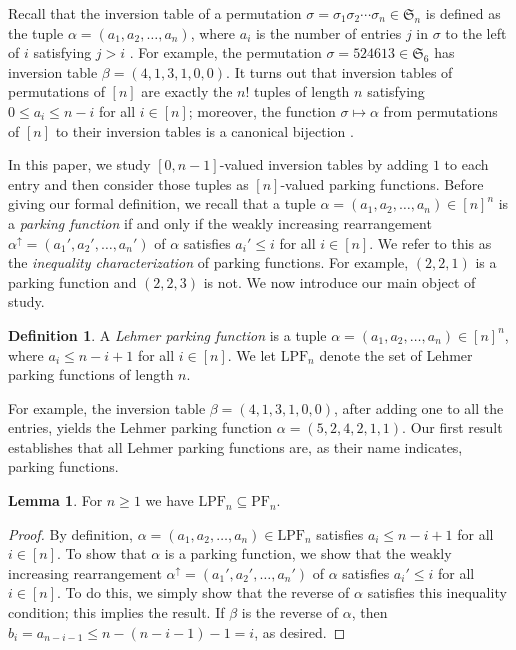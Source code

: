 \documentclass{amsart}
\newcommand{\IT}{\mathrm{LPF}}
\newcommand{\PF}{\mathrm{PF}}
\theoremstyle{definition}
\newtheorem{lemma}[theorem]{Lemma}
\theoremstyle{definition}
\newtheorem{definition}{Definition}[section]
\theoremstyle{remark}
\begin{document}
Recall that the inversion table of a permutation $\sigma=\sigma_1\sigma_2\cdots\sigma_{n}\in\mathfrak{S}_n$ is defined as the tuple $\alpha=(a_1,a_2,\ldots,a_{n})$, where $a_i$ is the number of entries $j$ in $\sigma$ to the left of $i$ satisfying $j>i$ \cite[p. 30]{StanleyECVol1}.
For example, the permutation $\sigma=524613\in\mathfrak{S}_6$ has inversion table $\beta=(4,1,3,1,0,0)$.
It turns out that inversion tables of permutations of $[n]$ are exactly the $n!$ tuples of length $n$ satisfying $0\le a_i\le n-i$ for all $i\in[n]$;
moreover, the function $\sigma\mapsto\alpha$ from permutations of $[n]$ to their inversion tables is a canonical bijection \cite[Proposition 1.3.12]{StanleyECVol1}.

In this paper, we study $[0,n-1]$-valued inversion tables by adding $1$ to each entry and then consider those tuples as $[n]$-valued parking functions. 
Before giving our formal definition, we recall that a tuple $\alpha=(a_1,a_2,\ldots,a_{n})\in[n]^n$ is a \textit{parking function} if and only if the weakly increasing rearrangement $\alpha^\uparrow=(a_1',a_2',\ldots,a_{n}')$ of $\alpha$ satisfies $a_i'\leq i$ for all $i\in[n]$. We refer to this as the \textit{inequality characterization} of parking functions.
For example, $(2,2,1)$ is a parking function and $(2,2,3)$ is not.
We now introduce our main object of study.
\begin{definition}\label{def:Lehmer parking function}
    A \textit{Lehmer parking function} is a tuple $\alpha=(a_1,a_2,\ldots,a_{n})\in[n]^n$, where $a_i\le n-i+1$ for all $i\in[n]$. 
    We let $\IT_n$ denote the set of Lehmer parking functions of length $n$.
\end{definition}
For example, the inversion table $\beta=(4,1,3,1,0,0)$, after adding one to all the entries, yields the Lehmer parking function $\alpha=(5,2,4,2,1,1)$. 
Our first result establishes that all Lehmer parking functions are, as their name indicates, parking functions.
\begin{lemma}\label{lem:pf}
    For $n\geq 1$ we have $\IT_n\subseteq\PF_n$.
\end{lemma}
\begin{proof}
By definition, $\alpha=(a_1,a_2,\ldots,a_n)\in\IT_n$ satisfies $a_i\leq n-i+1$ for all $i\in[n]$. To show that $\alpha$ is a parking function, we show that the weakly increasing rearrangement $\alpha^\uparrow=(a_1',a_2',\ldots,a_n')$ of $\alpha$ satisfies $a_i'\leq i$ for all $i\in [n]$. To do this, we simply show that the reverse of $\alpha$ satisfies this inequality condition; this implies the result. If $\beta$ is the reverse of $\alpha$, then $b_i=a_{n-i-1}\le n-(n-i-1)-1=i$, as desired.
\end{proof}
\end{document}
